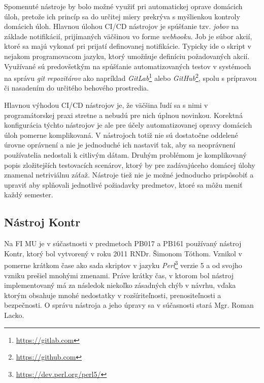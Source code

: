 \documentclass[
  digital, %
  twoside, %
  table,   %
  lof,     %
  lot,     %
]{fithesis3}
\begin{document}
Spomenuté nástroje by bolo možné využiť pri automatickej oprave domácich úloh, pretože ich princíp sa do určitej miery prekrýva s myšlienkou kontroly domácich úloh. Hlavnou úlohou CI/CD nástrojov je spúšťanie tzv. \emph{jobov} na základe notifikácií, prijímaných väčšinou vo forme \emph{webhooku}. Job je súbor akcií, ktoré sa majú vykonať pri prijatí definovanej notifikácie. Typicky ide o skript v nejakom programovacom jazyku, ktorý umožňuje definíciu požadovaných akcií. Využívané sú predovšetkým na spúšťanie automatizovaných testov v systémoch na správu \emph{git repozitárov} ako napríklad \emph{GitLab}\footnote{\url{https://gitlab.com}} alebo \emph{GitHub}\footnote{\url{https://github.com}}, spolu s prípravou či nasadením do určitého behového prostredia.  

Hlavnou výhodou CI/CD nástrojov je, že väčšina ľudí sa s nimi v programátorskej praxi stretne a nebudú pre nich úplnou novinkou. Korektná konfigurácia týchto nástrojov je ale pre účely automatizovanej opravy domácich úloh pomerne komplikovaná. V nástrojoch totiž nie sú dostatočne oddelené úrovne oprávnení a nie je jednoduché ich nastaviť tak, aby sa neoprávnení používatelia nedostali k citlivým dátam. Druhým problémom je komplikovaný popis zložitejších testovacích scenárov, ktorý by pre zadávajúceho domácej úlohy znamenal netriviálnu záťaž. Nástroje tiež nie je možné jednoducho prispôsobiť a upraviť aby splňovali jednotlivé požiadavky predmetov, ktoré sa môžu meniť každý semester.  

\subsection{Nástroj Kontr}

Na FI MU je v súčastnosti v predmetoch PB017 a PB161 používaný nástroj Kontr, ktorý bol vytvorený v roku 2011 RNDr. Šimonom Tóthom. Vznikol v pomerne krátkom čase ako sada skriptov v jazyku \emph{Perl}\footnote{\url{https://dev.perl.org/perl5/}} verzie 5 a od svojho vzniku prešiel mnohými zmenami. Práve krátky čas, v ktorom bol nástroj implementovaný má za následok niekoľko zásadných chýb v návrhu, vďaka ktorým obsahuje mnohé nedostatky v rozšíriteľnosti, prenositeľnosti a bezpečnosti. O správu nástroja a jeho úpravy sa v súčasnosti stará Mgr. Roman Lacko. 
\end{document}
